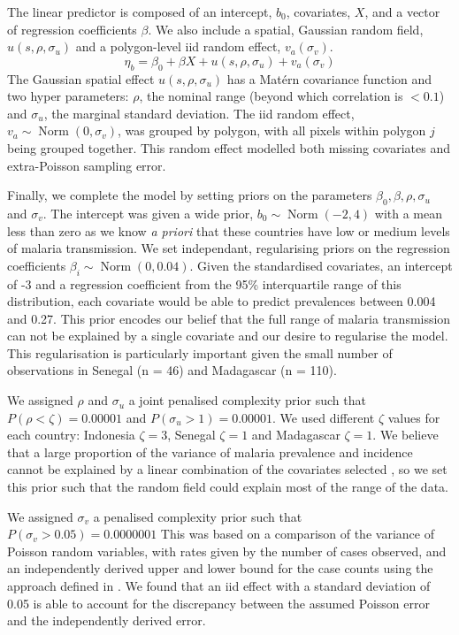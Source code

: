 \documentclass[10pt,letterpaper]{article}
\begin{document}
The linear predictor is composed of an intercept, $b_0$, covariates, $X$, and a vector of regression coefficients $\beta$.
We also include a spatial, Gaussian random field, $u(s, \rho, \sigma_u)$ and a polygon-level iid random effect, $ v_a(\sigma_v)$.
$$\eta_b = \beta_0 + \beta X  + u(s, \rho, \sigma_u) + v_a(\sigma_v) $$
The Gaussian spatial effect $u(s, \rho, \sigma_u)$ has a Mat\'ern covariance function and two hyper parameters: $\rho$, the nominal range (beyond which correlation is $< 0.1$) and $\sigma_u$, the marginal standard deviation.
The iid random effect, $v_a \sim \operatorname{Norm}(0, \sigma_v)$,  was grouped by polygon, with all pixels within polygon $j$ being grouped together.
This random effect modelled both missing covariates and extra-Poisson sampling error.


Finally, we complete the model by setting priors on the parameters $\beta_0, \beta, \rho, \sigma_u$ and $\sigma_v$.
The intercept was given a wide prior, $b_0 \sim \operatorname{Norm}(-2, 4)$ with a mean less than zero as we know \emph{a priori} that these countries have low or medium levels of malaria transmission.
We set independant, regularising priors on the regression coefficients $\beta_i \sim \operatorname{Norm}(0, 0.04)$. 
Given the standardised covariates, an intercept of -3 and a regression coefficient from the 95\% interquartile range of this distribution, each covariate would be able to predict prevalences between 0.004 and 0.27. 
This prior encodes our belief that the full range of malaria transmission can not be explained by a single covariate and our desire to regularise the model.
This regularisation is particularly important given the small number of observations in Senegal (n = 46) and Madagascar (n = 110).

We assigned $\rho$ and $\sigma_u$ a joint penalised complexity prior \cite{fuglstad2018constructing} such that $P(\rho < \zeta) = 0.00001$ and $P(\sigma_u > 1) = 0.00001$.
We used different $\zeta$ values for each country: Indonesia $\zeta = 3$, Senegal $\zeta = 1$ and Madagascar $\zeta = 1$.
We believe that a large proportion of the variance of malaria prevalence and incidence cannot be explained by a linear combination of the covariates selected \cite{bhatt2017improved}, so we set this prior such that the random field could explain most of the range of the data.

We assigned $\sigma_v$ a penalised complexity prior \cite{simpson2017penalising} such that $P(\sigma_v > 0.05) = 0.0000001$
This was based on a comparison of the variance of Poisson random variables, with rates given by the number of cases observed, and an independently derived upper and lower bound for the case counts using the approach defined in \cite{cibulskis2011worldwide}.
We found that an iid effect with a standard deviation of 0.05 is able to account for the discrepancy between the assumed Poisson error and the independently derived error.
\end{document}
